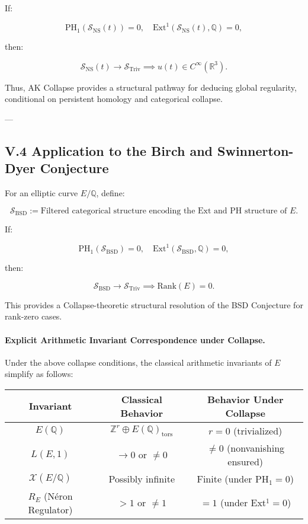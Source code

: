 \documentclass[11pt]{article}
\newcommand{\Sha}{\mathcal{X}}
\begin{document}
If:

\[
\mathrm{PH}_1(\mathcal{S}_{\mathrm{NS}}(t)) = 0, \quad \mathrm{Ext}^1(\mathcal{S}_{\mathrm{NS}}(t), \mathbb{Q}) = 0,
\]

then:

\[
\mathcal{S}_{\mathrm{NS}}(t) \longrightarrow \mathcal{S}_{\mathrm{Triv}} \implies u(t) \in C^\infty(\mathbb{R}^3).
\]

Thus, AK Collapse provides a structural pathway for deducing global regularity, conditional on persistent homology and categorical collapse.


---

\subsection*{V.4 Application to the Birch and Swinnerton-Dyer Conjecture}

For an elliptic curve \( E/\mathbb{Q} \), define:

\[
\mathcal{S}_{\mathrm{BSD}} := \text{Filtered categorical structure encoding the Ext and PH structure of } E.
\]

If:

\[
\mathrm{PH}_1(\mathcal{S}_{\mathrm{BSD}}) = 0, \quad \mathrm{Ext}^1(\mathcal{S}_{\mathrm{BSD}}, \mathbb{Q}) = 0,
\]

then:

\[
\mathcal{S}_{\mathrm{BSD}} \longrightarrow \mathcal{S}_{\mathrm{Triv}} \implies \mathrm{Rank}(E) = 0.
\]

This provides a Collapse-theoretic structural resolution of the BSD Conjecture for rank-zero cases.

\paragraph{Explicit Arithmetic Invariant Correspondence under Collapse.}

Under the above collapse conditions, the classical arithmetic invariants of \( E \) simplify as follows:

\begin{center}
\begin{tabular}{|c|c|c|}
\hline
\textbf{Invariant} & \textbf{Classical Behavior} & \textbf{Behavior Under Collapse} \\
\hline
$E(\mathbb{Q})$ & $\mathbb{Z}^r \oplus E(\mathbb{Q})_{\mathrm{tors}}$ & $r = 0$ (trivialized) \\
$L(E, 1)$ & $\to 0$ or $\neq 0$ & $\neq 0$ (nonvanishing ensured) \\
$\Sha(E/\mathbb{Q})$ & Possibly infinite & Finite (under PH$_1 = 0$) \\
$R_E$ (Néron Regulator) & $>1$ or $\neq 1$ & $=1$ (under Ext$^1 = 0$) \\
\hline
\end{tabular}
\end{center}
\end{document}
